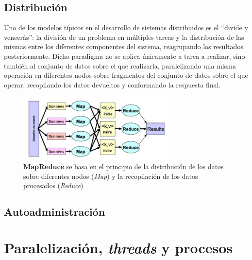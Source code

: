 \subsection{Distribución}

Uno de los modelos típicos en el desarrollo de sistemas distribuidos es el ``divide y vencerás'': la división de un problema en múltiples tareas y la distribución de las mismas entre los diferentes componentes del sistema, reagrupando los resultados posteriormente. Dicho paradigma no se aplica únicamente a tarea a realizar, sino también al conjunto de datos sobre el que realizarla, paralelizando una misma operación en diferentes nodos sobre fragmentos del conjunto de datos sobre el que operar, recopilando los datos devueltos y conformando la respuesta final.


\begin{figure}[H]
\centering
\includegraphics[width=0.7\textwidth]{Chapter2/Figures/Mapreduce.png}
\caption{\textbf{MapReduce} se basa en el principio de la distribución de los datos sobre diferentes nodos (\textit{Map}) y la recopilación de los datos procesados (\textit{Reduce})}
\label{fig:mapreduce}
\end{figure}

\subsection{Autoadministración}


\section{Paralelización, \textit{threads} y procesos}

